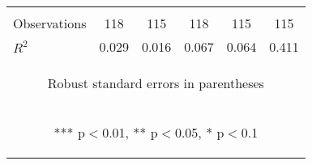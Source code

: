 \begin{center}
\begin{tabular}{lccccc}
\vspace{4pt} & \begin{footnotesize}\end{footnotesize} & \begin{footnotesize}\end{footnotesize} & \begin{footnotesize}\end{footnotesize} & \begin{footnotesize}\end{footnotesize} & \begin{footnotesize}\end{footnotesize} \\
Observations & 118 & 115 & 118 & 115 & 115 \\
 $R^2$ & 0.029 & 0.016 & 0.067 & 0.064 & 0.411 \\ \hline
\multicolumn{6}{c}{\begin{footnotesize} Robust standard errors in parentheses\end{footnotesize}} \\
\multicolumn{6}{c}{\begin{footnotesize} *** p$<$0.01, ** p$<$0.05, * p$<$0.1\end{footnotesize}} \\
\end{tabular}
\end{center}
